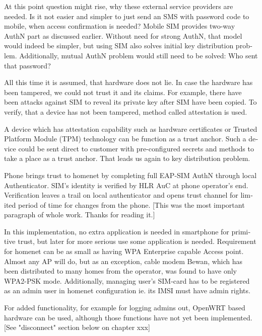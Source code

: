 \documentclass[12pt,a4paper,english]{tutthesis}
\begin{document}
\begin{otherlanguage}{english}
At this point question might rise, why these external service
providers are needed. Is it not easier and simpler to just send 
an SMS with password code to mobile, when access confirmation is needed?
Mobile SIM provides two-way AuthN part as discussed earlier.
Without need for strong AuthN, that model would indeed be 
simpler, but using SIM also solves initial key distribution problem.
Additionally, mutual AuthN problem would still need to be solved:
Who sent that password?



All this time it is assumed, that hardware does not lie. In case
the hardware has been tampered, we could not trust it and its claims.
For example, there have been attacks against SIM to reveal its private
key after SIM have been copied.  To verify, that a device has not been
tampered, method called attestation is used.

A device which has attestation capability such as 
hardware certificates or Trusted Platform Module (TPM) technology
can be function as a trust anchor.
Such a device could be sent direct to customer with pre-configured
secrets and methods to take a place as a trust anchor. 
That leads us again to key distribution problem.






Phone brings trust to homenet by completing full EAP-SIM AuthN through
local Authenticator. SIM's identity is verified by HLR AuC at phone
operator's end. Verification leaves a trail on local authenticator and
opens trust channel for limited period of time for changes from the phone.
[This was the most important paragraph of whole work. Thanks for
reading it.]





In this implementation, no extra application is needed in smartphone
for primitive trust, but later for more serious use some application is needed.
Requirement for homenet can be as small as having WPA Enterprise capable
Access point. Almost any AP will  do, but as an exception, cable modem Bewan, which 
has been distributed to many homes from the operator, was found to have only WPA2-PSK mode.
Additionally, managing user's SIM-card has to be registered as an admin user in homenet 
configuration ie. its IMSI must have admin rights.


 For added functionality, for example for
logging admins out, OpenWRT based hardware can be used, although those functions have
not yet been implemented. 
[See "disconnect" section below on chapter xxx]


\end{otherlanguage}
\end{document}
